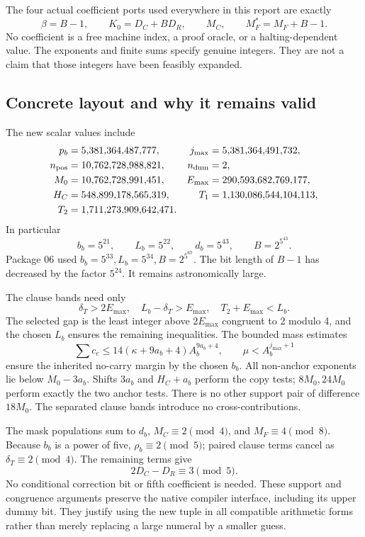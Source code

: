 \documentclass[11pt]{article}
\begin{document}
The four actual coefficient ports used everywhere in this report are exactly
\begin{equation}\label{eq:ports}
\boxed{\beta=B-1,\qquad K_0=D_C+BD_R,\qquad M_C,\qquad M_F^*=M_F+B-1.}
\end{equation}
No coefficient is a free machine index, a proof oracle, or a halting-dependent value. The exponents and finite sums specify genuine integers. They are not a claim that those integers have been feasibly expanded.

\subsection{Concrete layout and why it remains valid}

The new scalar values include
\begin{align*}
p_b&=5{,}381{,}364{,}487{,}777,&j_{\max}&=5{,}381{,}364{,}491{,}732,\\
n_{\rm pos}&=10{,}762{,}728{,}988{,}821,&n_{\rm dum}&=2,\\
M_0&=10{,}762{,}728{,}991{,}451,&E_{\max}&=290{,}593{,}682{,}769{,}177,\\
H_C&=548{,}899{,}178{,}565{,}319,&T_1&=1{,}130{,}086{,}544{,}104{,}113,\\
T_2&=1{,}711{,}273{,}909{,}642{,}471.
\end{align*}
In particular
\[
b_b=5^{21},\qquad L_b=5^{22},\qquad d_b=5^{43},\qquad B=2^{5^{43}}.
\]
Package 06 used $b_b=5^{33},L_b=5^{34},B=2^{5^{67}}$.
The bit length of $B-1$ has decreased by the factor $5^{24}$.
It remains astronomically large.

The clause bands need only
\[
\delta_T>2E_{\max},\quad L_b-\delta_T>E_{\max},\quad T_2+E_{\max}<L_b.
\]
The selected gap is the least integer above $2E_{\max}$ congruent to 2 modulo 4, and the chosen $L_b$ ensures the remaining inequalities. The bounded mass estimates
\[
\sum c_e\leq14(\kappa+9a_b+4)A_b^{9a_b+4},\qquad
\mu<A_b^{j_{\max}+1}
\]
ensure the inherited no-carry margin by the chosen $b_b$. All non-anchor exponents lie below $M_0-3a_b$. Shifts $3a_b$ and $H_C+a_b$ perform the copy tests; $8M_0,24M_0$ perform exactly the two anchor tests. There is no other support pair of difference $18M_0$. The separated clause bands introduce no cross-contributions.

The mask populations sum to $d_b$, $M_C\equiv2\pmod4$, and $M_F\equiv4\pmod8$. Because $b_b$ is a power of five, $\rho_b\equiv2\pmod5$; paired clause terms cancel as $\delta_T\equiv2\pmod4$. The remaining terms give
\[
2D_C-D_R\equiv3\pmod5.
\]
No conditional correction bit or fifth coefficient is needed. These support and congruence arguments preserve the native compiler interface, including its upper dummy bit. They justify using the new tuple in all compatible arithmetic forms rather than merely replacing a large numeral by a smaller guess.
\end{document}
